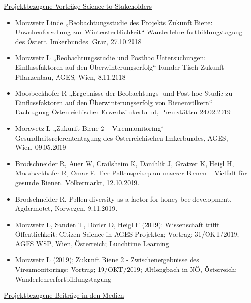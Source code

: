 \underline{Projektbezogene Vorträge Science to Stakeholders}

\begin{itemize}
    \item 
    Morawetz Linde „Beobachtungsstudie des Projekts Zukunft Biene: Ursachenforschung zur Wintersterblichkeit“ Wanderlehrerfortbildungstagung des Österr. Imkerbundes, Graz, 27.10.2018

    \item 
    Morawetz L „Beobachtungsstudie und Posthoc Untersuchungen: Einflussfaktoren auf den Überwinterungserfolg“ Runder Tisch Zukunft Pflanzenbau, AGES, Wien, 8.11.2018

    \item 
    Moosbeckhofer R „Ergebnisse der Beobachtungs- und Post hoc-Studie zu Einflussfaktoren auf den Überwinterungserfolg von Bienenvölkern“ Fachtagung Österreichischer Erwerbsimkerbund, Premstätten 24.02.2019

    \item 
    Morawetz L „Zukunft Biene 2 – Virenmonitoring“ Gesundheitsreferententagung des Österreichischen Imkerbundes, AGES, Wien, 09.05.2019
    
    \item 
    Brodschneider R, Auer W, Crailsheim K, Danihlik J, Gratzer K, Heigl H, Moosbeckhofer R, Omar E. Der Pollenspeiseplan unserer Bienen – Vielfalt für gesunde Bienen. Völkermarkt, 12.10.2019.
    
    \item 
    Brodschneider R. Pollen diversity as a factor for honey bee development. Agdermotet, Norwegen, 9.11.2019.
    
    \item
    Morawetz L, Sandén T, Dörler D, Heigl F (2019); Wissenschaft trifft Öffentlichkeit: Citizen Science in AGES Projekten; Vortrag; 31/OKT/2019; AGES WSP, Wien, Österreich; Lunchtime Learning

    \item
    Morawetz L (2019); Zukunft Biene 2 - Zwischenergebnisse des Virenmonitorings; Vortrag; 19/OKT/2019; Altlengbach in NÖ, Österreich; Wanderlehrerfortbildungstagung

\end{itemize}

\underline{Projektbezogene Beiträge in den Medien}

